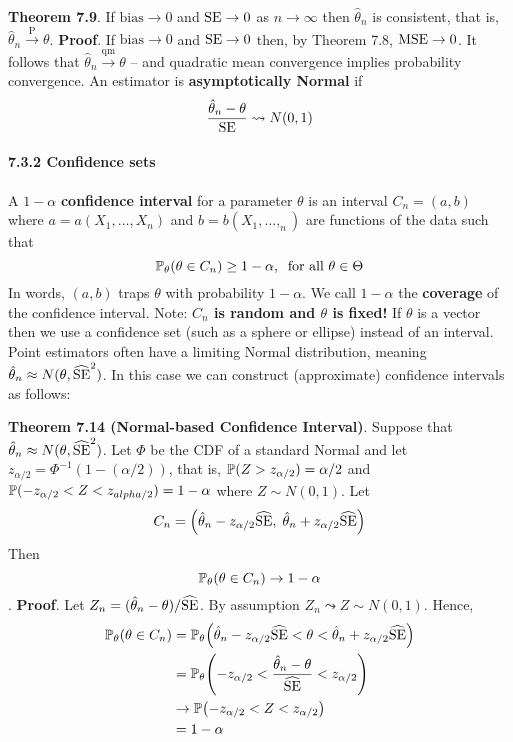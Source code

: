 \textbf{Theorem 7.9}. If \(\text{bias} \rightarrow 0\) and
\(\operatorname{\mathrm{SE}} \rightarrow 0\) as \(n \rightarrow \infty\) then
\(\hat{\theta}_{n}\) is consistent, that is,
\(\hat{\theta}_{n} \xrightarrow{\textrm{P}} \theta\).
\textbf{Proof}. If \(\text{bias} \rightarrow 0\) and
\(\operatorname{\mathrm{SE}} \rightarrow 0\) then, by Theorem 7.8,
\(\operatorname{\mathrm{MSE}} \rightarrow 0\). It follows that
\(\hat{\theta}_{n} \xrightarrow{\text{qm}} \theta\) -- and quadratic mean
convergence implies probability convergence.
An estimator is \textbf{asymptotically Normal} if
\[
\frac{\hat{\theta}_{n} - \theta}{\operatorname{\mathrm{SE}} } \leadsto N(0, 1)
\]
\paragraph{7.3.2 Confidence sets}\label{confidence-sets}
A \(1 - \alpha\) \textbf{confidence interval} for a parameter \(\theta\)
is an interval \(C_{n} = (a, b)\) where \(a = a(X_{1}, \dots, X_{n})\) and
\(b = b(X_{1}, \dots, _{n})\) are functions of the data such that
\[
\operatorname{\mathbb{P}}_\theta(\theta \in C_{n}) \geq 1 - \alpha, \;\; \text{for all } \theta \in \Theta
\]
In words, \((a, b)\) traps \(\theta\) with probability \(1 - \alpha\).
We call \(1 - \alpha\) the \textbf{coverage} of the confidence interval.
Note: \textbf{\(C_{n}\) is random and \(\theta\) is fixed!}
If \(\theta\) is a vector then we use a confidence set (such as a sphere
or ellipse) instead of an interval.
Point estimators often have a limiting Normal distribution, meaning
\(\hat{\theta}_{n} \approx N(\theta, \widehat{\operatorname{\mathrm{SE}}}^{2})\). In this case we
can construct (approximate) confidence intervals as follows:

\textbf{Theorem 7.14 (Normal-based Confidence Interval)}. Suppose that
\(\hat{\theta}_{n} \approx N(\theta, \widehat{\operatorname{\mathrm{SE}}}^{2})\). Let \(\Phi\) be
the CDF of a standard Normal and let
\(z_{\alpha/2} = \Phi^{-1}\left(1 - (\alpha / 2)\right)\), that is,
\(\operatorname{\mathbb{P}}(Z > z_{\alpha/2}) = \alpha/2\) and
\(\operatorname{\mathbb{P}}(-z_{\alpha/2} < Z < z_{alpha/2}) = 1 - \alpha\) where
\(Z \sim N(0, 1)\). Let
\[
C_{n} = \left(\hat{\theta}_{n} - z_{\alpha/2} \widehat{\SE}, \; \hat{\theta}_{n} + z_{\alpha/2} \widehat{\SE}\right)
\]
Then
\[
\operatorname{\mathbb{P}}_\theta(\theta \in C_{n}) \rightarrow 1 - \alpha
\].
\textbf{Proof}.
Let \(Z_{n} = (\hat{\theta}_{n} - \theta) / \widehat{\operatorname{\mathrm{SE}}}\). By assumption
\(Z_{n} \leadsto Z \sim N(0, 1)\). Hence,
\begin{align*}
\PROB_\theta(\theta \in C_{n}) 
& = \PROB_\theta \left(\hat{\theta}_{n} - z_{\alpha/2} \widehat{\SE} < \theta < \hat{\theta}_{n} + z_{\alpha/2} \widehat{\SE} \right) \\
& = \PROB_\theta \left(-z_{\alpha/2} < \frac{\hat{\theta}_{n} - \theta}{\widehat{\SE}} < z_{\alpha/2} \right) \\
& \rightarrow \PROB\left(-z_{\alpha/2} < Z < z_{\alpha/2}\right) \\
&= 1 - \alpha
\end{align*}
